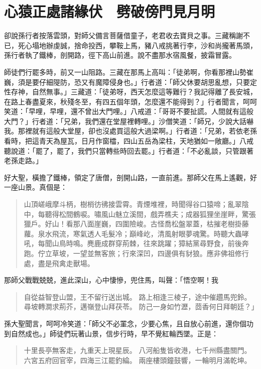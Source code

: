 
\chapter{心猿正處諸緣伏　劈破傍門見月明}

卻說孫行者按落雲頭，對師父備言菩薩借童子，老君收去寶貝之事。三藏稱謝不已，死心塌地辦虔誠，捨命投西，攀鞍上馬，豬八戒挑著行李，沙和尚攏著馬頭，孫行者執了鐵棒，剖開路，徑下高山前進。說不盡那水宿風餐，披霜冒露。

師徒們行罷多時，前又一山阻路。三藏在那馬上高叫：「徒弟啊，你看那裡山勢崔巍，須是要仔細隄防，恐又有魔障侵身也。」行者道：「師父休要胡思亂想，只要定性存神，自然無事。」三藏道：「徒弟呀，西天怎麼這等難行？我記得離了長安城，在路上春盡夏來，秋殘冬至，有四五個年頭，怎麼還不能得到？」行者聞言，呵呵笑道：「早哩，早哩，還不曾出大門哩。」八戒道：「哥哥不要扯謊。人間就有這般大門？」行者道：「兄弟，我們還在堂屋裡轉哩。」沙僧笑道：「師兄，少說大話嚇我。那裡就有這般大堂屋，卻也沒處買這般大過梁啊。」行者道：「兄弟，若依老孫看時，把這青天為屋瓦，日月作窗櫺，四山五岳為梁柱，天地猶如一敞廳。」八戒聽說道：「罷了，罷了，我們只當轉些時回去罷。」行者道：「不必亂談，只管跟著老孫走路。」

好大聖，橫擔了鐵棒，領定了唐僧，剖開山路，一直前進。那師父在馬上遙觀，好一座山景。真個是：
\begin{quote}
山頂嵯峨摩斗柄，樹梢彷彿接雲霄。青煙堆裡，時聞得谷口猿啼；亂翠陰中，每聽得松間鶴唳。嘯風山魅立溪間，戲弄樵夫；成器狐狸坐崖畔，驚張獵戶。好山！看那八面崖巍，四圍險峻。古怪喬松盤翠蓋，枯摧老樹掛藤蘿。泉水飛流，寒氣透人毛髮冷；巔峰屹，清風射眼夢魂驚。時聽大蟲哮吼，每聞山鳥時鳴。麂鹿成群穿荊棘，往來跳躍；獐結黨尋野食，前後奔跑。佇立草坡，一望並無客旅；行來深凹，四邊俱有豺狼。應非佛祖修行處，盡是飛禽走獸場。
\end{quote}

那師父戰戰兢兢，進此深山，心中悽慘，兜住馬，叫聲：「悟空啊！我
\begin{quote}
自從益智登山盟，王不留行送出城。
路上相逢三棱子，途中催趲馬兜鈴。
尋坡轉澗求荊芥，邁嶺登山拜茯苓。
防己一身如竹瀝，茴香何日拜朝廷？」
\end{quote}

孫大聖聞言，呵呵冷笑道：「師父不必罣念，少要心焦，且自放心前進，還你個功到自然成也。」師徒們玩著山景，信步行時，早不覺紅輪西墜。正是：
\begin{quote}
十里長亭無客走，九重天上現星辰。
八河船隻皆收港，七千州縣盡關門。
六宮五府回官宰，四海三江罷釣綸。
兩座樓頭鐘鼓響，一輪明月滿乾坤。
\end{quote}

